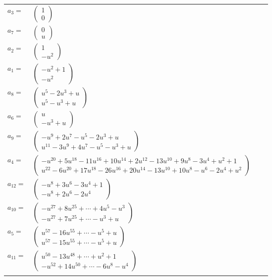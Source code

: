 \documentclass[1p]{elsarticle_modified}
\theoremstyle{definition}
\begin{document}
\begin{tabular}{m{7pt} m{180pt} m{7pt} m{180pt} }
\flushright $a_{3}=$&$\begin{pmatrix}1\\0\end{pmatrix}$ \\
\flushright $a_{7}=$&$\begin{pmatrix}0\\u\end{pmatrix}$ \\
\flushright $a_{2}=$&$\begin{pmatrix}1\\- u^2\end{pmatrix}$ \\
\flushright $a_{1}=$&$\begin{pmatrix}- u^2+1\\- u^2\end{pmatrix}$ \\
\flushright $a_{8}=$&$\begin{pmatrix}u^5-2 u^3+u\\u^5- u^3+u\end{pmatrix}$ \\
\flushright $a_{6}=$&$\begin{pmatrix}u\\- u^3+u\end{pmatrix}$ \\
\flushright $a_{9}=$&$\begin{pmatrix}- u^9+2 u^7- u^5-2 u^3+u\\u^{11}-3 u^9+4 u^7- u^5- u^3+u\end{pmatrix}$ \\
\flushright $a_{4}=$&$\begin{pmatrix}- u^{20}+5 u^{18}-11 u^{16}+10 u^{14}+2 u^{12}-13 u^{10}+9 u^8-3 u^4+u^2+1\\u^{22}-6 u^{20}+17 u^{18}-26 u^{16}+20 u^{14}-13 u^{10}+10 u^8- u^6-2 u^4+u^2\end{pmatrix}$ \\
\flushright $a_{12}=$&$\begin{pmatrix}- u^8+3 u^6-3 u^4+1\\- u^8+2 u^6-2 u^4\end{pmatrix}$ \\
\flushright $a_{10}=$&$\begin{pmatrix}- u^{27}+8 u^{25}+\cdots+4 u^5- u^3\\- u^{27}+7 u^{25}+\cdots- u^3+u\end{pmatrix}$ \\
\flushright $a_{5}=$&$\begin{pmatrix}u^{57}-16 u^{55}+\cdots- u^5+u\\u^{57}-15 u^{55}+\cdots- u^5+u\end{pmatrix}$ \\
\flushright $a_{11}=$&$\begin{pmatrix}u^{50}-13 u^{48}+\cdots+u^2+1\\- u^{52}+14 u^{50}+\cdots-6 u^8- u^4\end{pmatrix}$\\&\end{tabular}
\end{document}
